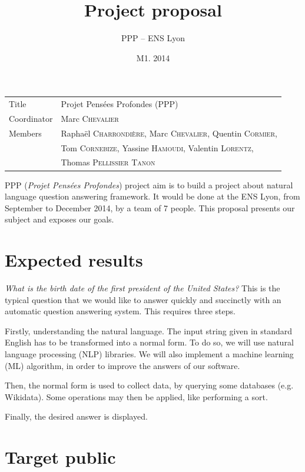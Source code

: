 \documentclass[a4paper,10pt]{article}
\title{Project proposal}
\author{PPP \--- ENS Lyon}
\date{M1. 2014}
\begin{document}
\maketitle

\begin{center}
 \begin{tabular}{|ll|}
\hline
Title & Projet Pensées Profondes (PPP)\\
Coordinator & Marc \textsc{Chevalier}\\
Members & Raphaël \textsc{Charrondière}, Marc \textsc{Chevalier}, Quentin \textsc{Cormier}, \\
        & Tom \textsc{Cornebize}, Yassine \textsc{Hamoudi}, Valentin \textsc{Lorentz},\\
        & Thomas \textsc{Pellissier} \textsc{Tanon}\\
\hline
\end{tabular}
\end{center}

PPP (\textit{Projet Pensées Profondes}) project aim is to build a project about natural language question answering framework. It would be done at the ENS Lyon, from September to December 2014, by a team of 7 people. This proposal presents our subject and exposes our goals.

\section{Expected results}

\emph{What is the birth date of the first president of the United States?} This is the typical question that we would like to answer quickly and succinctly with an automatic question answering system. This requires three steps.

Firstly, understanding the natural language. The input string given in standard English has to be transformed into a normal form. To do so, we will use natural language processing (NLP) libraries. We will also implement a machine learning (ML) algorithm, in order to improve the answers of our software.

Then, the normal form is used to collect data, by querying some databases (e.g. Wikidata). Some operations may then be applied, like performing a sort.

Finally, the desired answer is displayed.

\section{Target public}
\end{document}
